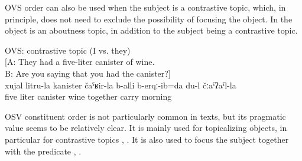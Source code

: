 OVS order can also be used when the subject is a contrastive topic, which, in principle, does not need to exclude the possibility of focusing the object. In  the object is an aboutness topic, in addition to the subject being a contrastive topic.
%
\begin{exe}
	\ex	OVS: contrastive topic (I vs. they)\\\label{ex:I had taken the five-litre canister of wine in the morning OVS}%
		[A: They had a five-liter canister of wine.\\\hphantom{[}B: Are you saying that you had the canister?]\\
	\gll	xujal	litru-la	kanister	čaˁʁir-la	b-alli	b-erqː-ib=da	du-l	čːaˁʡaˁl-la\\
		five	liter	canister	wine	\tsc{n-}together	carry		morning\\
	\glt	{}
\end{exe}

OSV constituent order is not particularly common in texts, but its pragmatic value seems to be relatively clear. It is mainly used for topicalizing objects, in particular for contrastive topics , . It is also used to focus the subject together with the predicate , \refex{ex:Well, I know her; [that Salikhat who married Rasul}.


